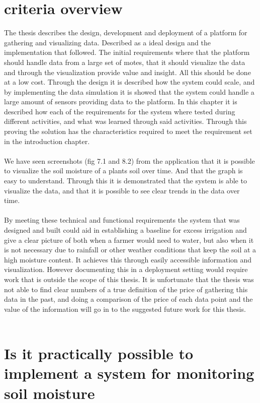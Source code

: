 \documentclass[]{uiophd}
\begin{document}
\section{criteria overview}
The thesis describes the design, development and deployment of a platform for gathering and visualizing data. Described as a ideal design and the implementation that followed. The initial requirements where that the platform should handle data from a large set of motes, that it should visualize the data and through the visualization provide value and insight. All this should be done at a low cost. Through the design it is described how the system could scale, and by implementing the data simulation it is showed that the system could handle a large amount of sensors providing data to the platform. In this chapter it is described how each of the requirements for the system where tested during different activities, and what was learned through said activities. Through this proving the solution has the characteristics required to meet the requirement set in the introduction chapter.
\\\\
We have seen screenshots (fig 7.1 and 8.2) from the application that it is possible to visualize the soil moisture of a plants soil over time. And that the graph is easy to understand. Through this it is demonstrated that the system is able to visualize the data, and that it is possible to see clear trends in the data over time.
\\\\
By meeting these technical and functional requirements the system that was  designed and built could aid in establishing a baseline for excess irrigation and give a clear picture of both when a farmer would need to water, but also when it is not necessary due to rainfall or other weather conditions that keep the soil at a high moisture content. It achieves this through easily accessible information and visualization. However documenting this in a deployment setting would require work that is outside the scope of this thesis. It is unfortunate that the thesis was not able to find clear numbers of a true definition of the price of gathering this data in the past, and doing a comparison of the price of each data point and the value of the information will go in to the suggested future work for this thesis.
\\\\
\section{ Is it practically possible to implement a system for monitoring soil moisture }
\end{document}
